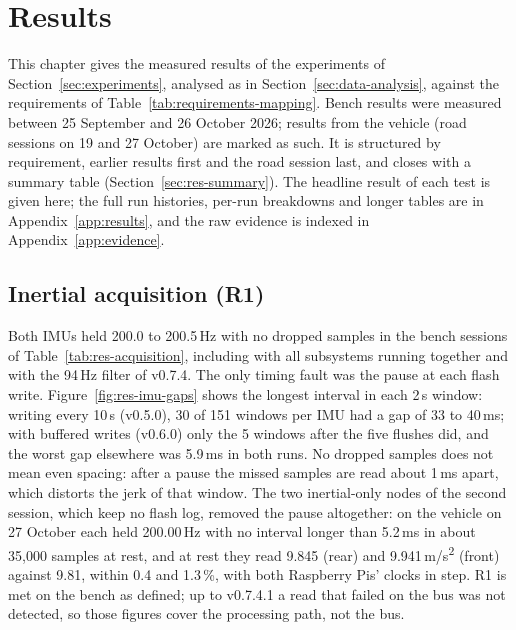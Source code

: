 \chapter{Results}
\label{chap:results}

This chapter gives the measured results of the experiments of Section~\ref{sec:experiments}, analysed as in Section~\ref{sec:data-analysis}, against the requirements of Table~\ref{tab:requirements-mapping}. Bench results were measured between 25 September and 26 October 2026; results from the vehicle (road sessions on 19 and 27 October) are marked as such. It is structured by requirement, earlier results first and the road session last, and closes with a summary table (Section~\ref{sec:res-summary}). The headline result of each test is given here; the full run histories, per-run breakdowns and longer tables are in Appendix~\ref{app:results}, and the raw evidence is indexed in Appendix~\ref{app:evidence}.

\section{Inertial acquisition (R1)}
\label{sec:res-acq}

Both IMUs held 200.0 to 200.5\,Hz with no dropped samples in the bench sessions of Table~\ref{tab:res-acquisition}, including with all subsystems running together and with the 94\,Hz filter of v0.7.4. The only timing fault was the pause at each flash write. Figure~\ref{fig:res-imu-gaps} shows the longest interval in each 2\,s window: writing every 10\,s (v0.5.0), 30 of 151 windows per IMU had a gap of 33 to 40\,ms; with buffered writes (v0.6.0) only the 5 windows after the five flushes did, and the worst gap elsewhere was 5.9\,ms in both runs. No dropped samples does not mean even spacing: after a pause the missed samples are read about 1\,ms apart, which distorts the jerk of that window. The two inertial-only nodes of the second session, which keep no flash log, removed the pause altogether: on the vehicle on 27 October each held 200.00\,Hz with no interval longer than 5.2\,ms in about 35,000 samples at rest, and at rest they read 9.845 (rear) and 9.941\,m/s\textsuperscript{2} (front) against 9.81, within 0.4 and 1.3\,\%, with both Raspberry Pis' clocks in step. R1 is met on the bench as defined; up to v0.7.4.1 a read that failed on the bus was not detected, so those figures cover the processing path, not the bus.

